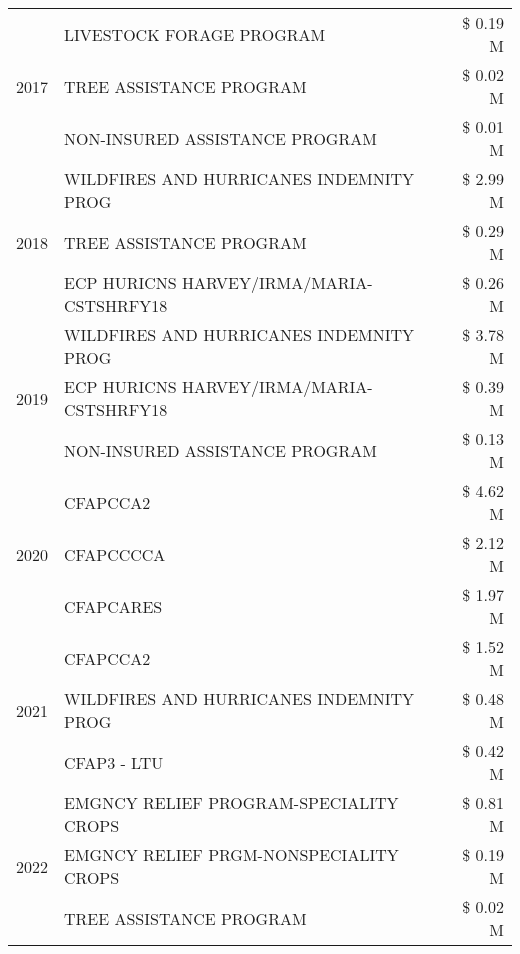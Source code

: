\begin{tabular}{llr}
\cline{1-3}
\multirow[t]{3}{*}{2017} & LIVESTOCK FORAGE PROGRAM & \$ 0.19 M \\
 & TREE ASSISTANCE PROGRAM & \$ 0.02 M \\
 & NON-INSURED ASSISTANCE PROGRAM & \$ 0.01 M \\
\cline{1-3}
\multirow[t]{3}{*}{2018} & WILDFIRES AND HURRICANES INDEMNITY PROG & \$ 2.99 M \\
 & TREE ASSISTANCE PROGRAM & \$ 0.29 M \\
 & ECP HURICNS HARVEY/IRMA/MARIA-CSTSHRFY18 & \$ 0.26 M \\
\cline{1-3}
\multirow[t]{3}{*}{2019} & WILDFIRES AND HURRICANES INDEMNITY PROG & \$ 3.78 M \\
 & ECP HURICNS HARVEY/IRMA/MARIA-CSTSHRFY18 & \$ 0.39 M \\
 & NON-INSURED ASSISTANCE PROGRAM & \$ 0.13 M \\
\cline{1-3}
\multirow[t]{3}{*}{2020} & CFAPCCA2 & \$ 4.62 M \\
 & CFAPCCCCA & \$ 2.12 M \\
 & CFAPCARES & \$ 1.97 M \\
\cline{1-3}
\multirow[t]{3}{*}{2021} & CFAPCCA2 & \$ 1.52 M \\
 & WILDFIRES AND HURRICANES INDEMNITY PROG & \$ 0.48 M \\
 & CFAP3 - LTU & \$ 0.42 M \\
\cline{1-3}
\multirow[t]{3}{*}{2022} & EMGNCY RELIEF PROGRAM-SPECIALITY CROPS & \$ 0.81 M \\
 & EMGNCY RELIEF PRGM-NONSPECIALITY CROPS & \$ 0.19 M \\
 & TREE ASSISTANCE PROGRAM & \$ 0.02 M \\
\cline{1-3}
\bottomrule
\end{tabular}
